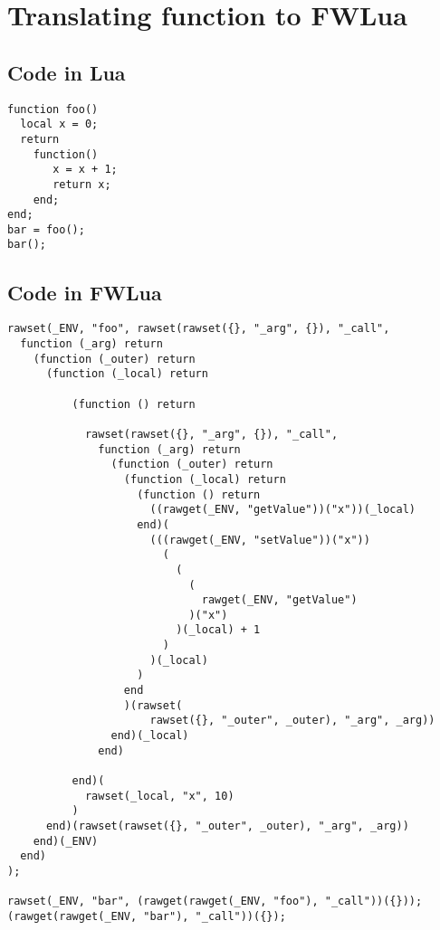 \chapter{Translating function to FWLua\label{app:function}}

\section{Code in Lua}

\begin{verbatim}
function foo()
  local x = 0;
  return 
    function() 
       x = x + 1;
       return x; 
    end;
end;
bar = foo();
bar();
\end{verbatim}

\newpage
\section{Code in FWLua}

\begin{verbatim}
rawset(_ENV, "foo", rawset(rawset({}, "_arg", {}), "_call",
  function (_arg) return
    (function (_outer) return
      (function (_local) return

          (function () return

            rawset(rawset({}, "_arg", {}), "_call",
              function (_arg) return
                (function (_outer) return
                  (function (_local) return
                    (function () return
                      ((rawget(_ENV, "getValue"))("x"))(_local)
                    end)(
                      (((rawget(_ENV, "setValue"))("x"))
                        (
                          (
                            (
                              rawget(_ENV, "getValue")
                            )("x")
                          )(_local) + 1
                        )
                      )(_local)
                    )
                  end
                  )(rawset(
                      rawset({}, "_outer", _outer), "_arg", _arg))
                end)(_local)
              end)

          end)(
            rawset(_local, "x", 10)
          )
      end)(rawset(rawset({}, "_outer", _outer), "_arg", _arg))
    end)(_ENV)
  end)
);

rawset(_ENV, "bar", (rawget(rawget(_ENV, "foo"), "_call"))({}));
(rawget(rawget(_ENV, "bar"), "_call"))({});
\end{verbatim}
